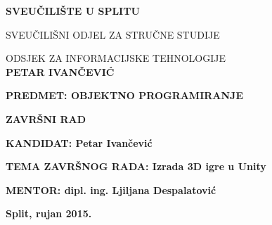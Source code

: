 \begin{center}
\thispagestyle{empty}

\begingroup
    \fontsize{14pt}{12pt}\selectfont\bfseries\center
 	SVEUČILIŠTE U SPLITU \par
	SVEUČILIŠNI ODJEL ZA STRUČNE STUDIJE \par
	ODSJEK ZA INFORMACIJSKE TEHNOLOGIJE
\endgroup\\[4cm]

{ \fontsize{18pt}{12pt}\selectfont\bfseries PETAR IVANČEVIĆ}\\[1cm]
\end{center}

{ \fontsize{14pt}{12pt}\selectfont\bfseries PREDMET: OBJEKTNO PROGRAMIRANJE}\\[1cm]

\begin{center}
{ \fontsize{16pt}{12pt}\selectfont\bfseries ZAVRŠNI RAD}
\end{center}

{ \fontsize{12pt}{2.5cm}\selectfont\bfseries KANDIDAT: Petar Ivančević}\par
{ \fontsize{12pt}{2.5cm}\selectfont\bfseries TEMA ZAVRŠNOG RADA: Izrada 3D igre u Unity}\par
{ \fontsize{12pt}{2.5cm}\selectfont\bfseries MENTOR: dipl. ing. Ljiljana Despalatović}

\begin{center}
\vfill
{ \fontsize{14pt}{12pt}\selectfont\bfseries Split, rujan 2015.}
\end{center}
